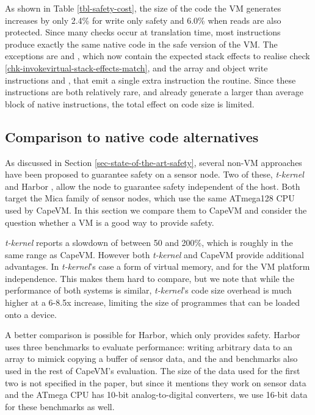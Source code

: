 As shown in Table \ref{tbl-safety-cost}, the size of the code the VM generates increases by only 2.4\% for write only safety and 6.0\% when reads are also protected. Since many checks occur at translation time, most instructions produce exactly the same native code in the safe version of the VM. The exceptions are  and , which now contain the expected stack effects to realise check \ref{chk-invokevirtual-stack-effects-match}, and the array and object write instructions  and , that emit a single extra  instruction the  routine. Since these instructions are both relatively rare, and already generate a larger than average block of native instructions, the total effect on code size is limited.

\subsection{Comparison to native code alternatives}
As discussed in Section \ref{sec-state-of-the-art-safety}, several non-VM approaches have been proposed to guarantee safety on a sensor node. Two of these, \emph{t-kernel} \cite{Gu:2006ww} and Harbor \cite{Kumar:2007ge}, allow the node to guarantee safety independent of the host. Both target the Mica family of sensor nodes, which use the same ATmega128 CPU used by CapeVM. In this section we compare them to CapeVM and consider the question whether a VM is a good way to provide safety.

\emph{t-kernel} reports a slowdown of between 50 and 200\%, which is roughly in the same range as CapeVM. However both \emph{t-kernel} and CapeVM provide additional advantages. In \emph{t-kernel}'s case a form of virtual memory, and for the VM platform independence. This makes them hard to compare, but we note that while the performance of both systems is similar, \emph{t-kernel}'s code size overhead is much higher at a 6-8.5x increase, limiting the size of programmes that can be loaded onto a device.

A better comparison is possible for Harbor, which only provides safety. Harbor uses three benchmarks to evaluate performance: writing arbitrary data to an array to mimick copying a buffer of sensor data, and the  and  benchmarks also used in the rest of CapeVM's evaluation. The size of the data used for the first two is not specified in the paper, but since it mentions they work on sensor data and the ATmega CPU has 10-bit analog-to-digital converters, we use 16-bit data for these benchmarks as well.


